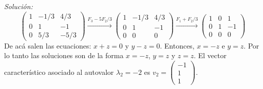 \documentclass{article}
\newenvironment{solution}
    {\textit{Solución:}}
    {}
\begin{document}
\begin{solution}
$$    $$
    $$
    \begin{pmatrix}
        1 & -1/3 & 4/3 \\
        0 & 1 & -1 \\
        0 & 5/3 & -5/3
    \end{pmatrix} \xrightarrow{F_3-5F_2/3}
    \begin{pmatrix}
        1 & -1/3 & 4/3 \\
        0 & 1 & -1 \\
        0 & 0 & 0
    \end{pmatrix} \xrightarrow{F_1+F_2/3}
    \begin{pmatrix}
        1 & 0 & 1 \\
        0 & 1 & -1 \\
        0 & 0 & 0
    \end{pmatrix}
    $$
    De acá salen las ecuaciones: $x+z = 0$ y $y-z = 0$. Entonces, $x=-z$ e $y=z$. Por lo tanto las soluciones son
    de la forma $x = -z$, $y = z$ y $z = z$. El vector característico asociado al autovalor $\lambda_2 = -2$ es $v_2 = \begin{pmatrix} -1 \\ 1 \\ 1 \end{pmatrix}$.


\end{solution}
\end{document}
